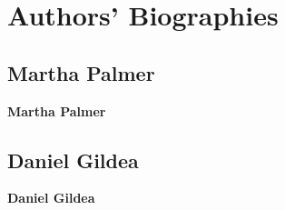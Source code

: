 

\chapter*{Authors' Biographies}


\section*{Martha Palmer}

\textbf{Martha Palmer}



\section*{Daniel Gildea}

\textbf{Daniel Gildea}

